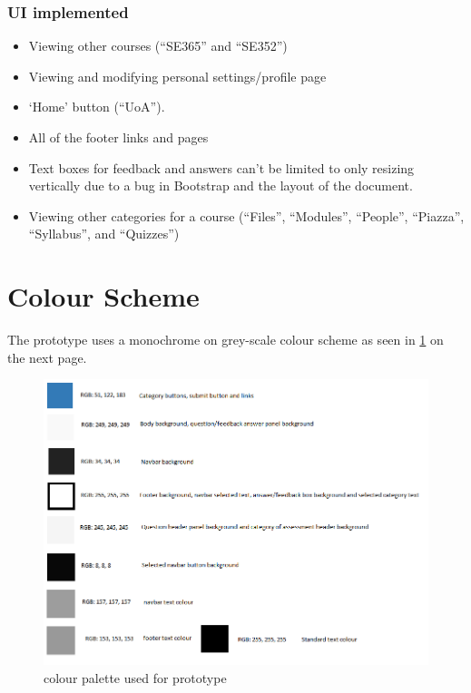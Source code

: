\documentclass[10pt,a4paper]{article}
\begin{document}
		\subsubsection*{UI implemented}
			\begin{itemize}
				\item Viewing other courses (``SE365'' and ``SE352'')
				\item Viewing and modifying personal settings/profile page
				\item `Home' button (``UoA'').
				\item All of the footer links and pages
				\item Text boxes for feedback and answers can't be limited to only resizing vertically due to a bug in Bootstrap and the layout of the document.
				\item Viewing other categories for a course (``Files'', ``Modules'', ``People'', ``Piazza'', ``Syllabus'', and ``Quizzes'')
			\end{itemize}
			
		
\section{Colour Scheme}
	The prototype uses a monochrome on grey-scale colour scheme as seen in \cref{fig:color} on the next page.\\
	
	\begin{figure}[h]
		\centering
		\includegraphics[width=\textwidth]{Colors.PNG}
		\caption{colour palette used for prototype}
		\label{fig:color}
	\end{figure}
	
\end{document}
